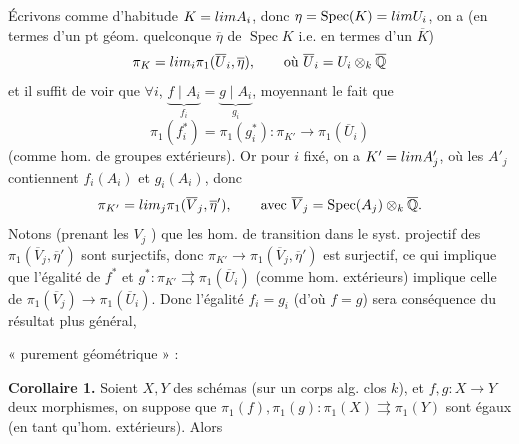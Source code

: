 \documentclass[11pt,a4paper]{article}
\begin{document}


Écrivons comme d'habitude $K = \varinjlim A_i$, donc  $\eta = \operatorname{Spec}(K) = \varprojlim U_i$, on a (en termes d'un pt géom. quelconque $\overline{\eta}$ de $\operatorname{Spec} K$ i.e. en termes d'un $\overline{K}$)
\[
\pi_K = \varprojlim_i \pi_1(\overline{U}_i, \overline{\eta}), \qquad \text{où } \overline{U}_i = U_i \otimes_{k} \overline{\mathbb{Q}}
\]
et il suffit de voir que $\forall i$, $\underbrace{f \mid A_i}_{f_i} = \underbrace{g \mid A_i}_{g_i}$, moyennant le fait que
\[
\pi_1(f_i^{*}) = \pi_1(g_i^{*}) : \pi_{K'} \longrightarrow \pi_1(\overline{U}_i)
\]
(comme hom. de groupes extérieurs). Or pour $i$ fixé, on a $K' = \varinjlim A'_j$, où les $A'_j$ contiennent $f_i(A_i)$ et $g_i(A_i)$, donc
\[
\pi_{K'} = \varprojlim_j \pi_1(\overline{V}_j, \overline{\eta}'), \qquad \text{avec } \overline{V}_j = \operatorname{Spec}(A_j) \otimes_{k} \overline{\mathbb{Q}} .
\]
Notons (prenant les $V_j$  ) que les hom. de transition dans le syst. projectif des $\pi_1(\overline{V}_j, \overline{\eta}')$ sont surjectifs, donc $\pi_{K'} \to \pi_1(\overline{V}_j, \overline{\eta}')$ est surjectif, ce qui implique que l'égalité de $f^{*}$ et $g^{*} : \pi_{K'} \rightrightarrows \pi_1(\overline{U}_i)$ (comme hom. extérieurs) implique celle de $\pi_1(\overline{V}_j) \to \pi_1(\overline{U}_i)$. Donc l'égalité $f_i = g_i$ (d'où $f = g$) sera conséquence du résultat plus général,


 « purement géométrique » :

\textbf{Corollaire 1.} Soient $X, Y$ des schémas  (sur un corps alg. clos $k$), et $f, g : X \to Y$ deux morphismes, on suppose que $\pi_1(f), \pi_1(g) : \pi_1(X) \rightrightarrows \pi_1(Y)$ sont égaux (en tant qu'hom. extérieurs). Alors
\end{document}
